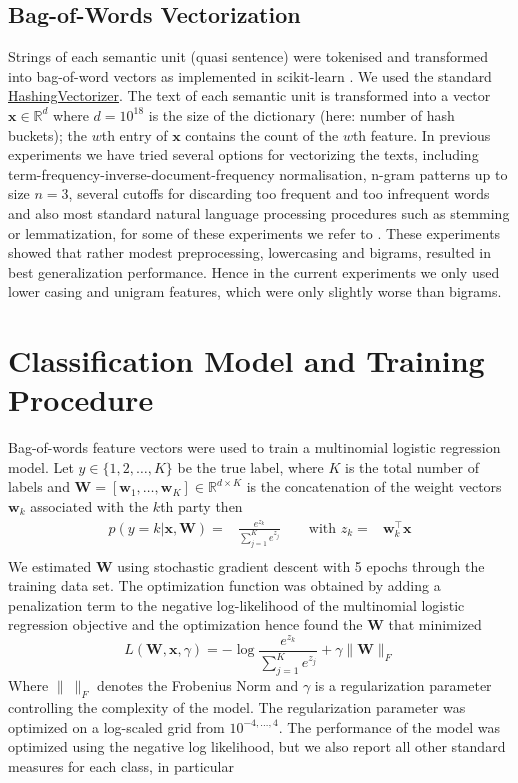\documentclass[runningheads,a4paper]{article}
\renewcommand{\vec}[1]{\mathbf{#1}}
\newcommand{\R}{\mathds{R}}
\begin{document}
\subsection{Bag-of-Words Vectorization}\label{sec:bow-vectorization}
Strings of each semantic unit (quasi sentence) were tokenised and transformed into bag-of-word vectors as implemented in scikit-learn \cite{scikit-learn}. We used the standard \href{http://scikit-learn.org/stable/modules/generated/sklearn.feature_extraction.text.HashingVectorizer.html}{HashingVectorizer}. The text of each semantic unit is transformed into a vector $\vec{x}\in\mathds{R}^d$ where $d=10^{18}$ is the size of the dictionary (here: number of hash buckets); the $w$th entry of $\vec{x}$ contains the count of the $w$th feature. In previous experiments we have tried several options for vectorizing the texts, including term-frequency-inverse-document-frequency normalisation, n-gram patterns up to size $n=3$, several cutoffs for discarding too frequent and too infrequent words and also most standard natural language processing procedures such as stemming or lemmatization, for some of these experiments we refer to \cite{Biessmann16}. These experiments showed that rather modest preprocessing, lowercasing and bigrams, resulted in best generalization performance. Hence in the current experiments we only used lower casing and unigram features, which were only slightly worse than bigrams. 

\section{Classification Model and Training Procedure}\label{sec:model}
Bag-of-words feature vectors were used to train a multinomial logistic regression model. Let $y\in\{1,2,\dots,K\}$ be the true  label, where $K$ is the total number of labels and $\vec{W}=[\vec{w}_1,\dots,\vec{w}_K]\in\R^{d\times K}$ is the concatenation of the weight vectors $\vec{w}_k$ associated with the $k$th party then 
\begin{eqnarray}\label{eq:logreg_multiclass}
p(y=k|\vec{x},\vec{W}) = &\frac{e^{z_k}}{\sum_{j=1}^K e^{z_j}} \qquad \textrm{with }  z_k=&\vec{w}_k^{\top}\vec{x} \\\nonumber
\end{eqnarray}
%
We estimated $\vec{W}$ using stochastic gradient descent with 5 epochs through the training data set. The optimization function was obtained by adding a penalization term to the negative log-likelihood of the multinomial logistic regression objective and the optimization hence found the $\vec{W}$ that minimized
\begin{equation}\label{eq:objective}
L(\vec{W}, \vec{x}, \gamma) = - \log{\frac{e^{z_k}}{\sum_{j=1}^K e^{z_j}}}+ \gamma \| \vec{W} \|_{F}
\end{equation}
Where $\|~\|_F$ denotes the Frobenius Norm and $\gamma$ is a regularization parameter controlling the complexity of the model. 
The regularization parameter was optimized on a log-scaled grid from $10^{-4,\dots,4}$. The performance of the model was optimized using the negative log likelihood, but we also report all other standard measures for each class, in particular 
\end{document}
